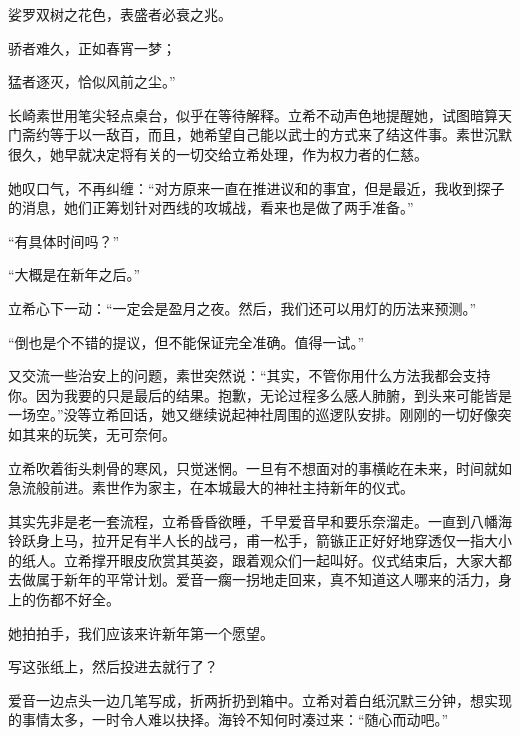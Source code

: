 \documentclass{article}
\begin{document}
娑罗双树之花色，表盛者必衰之兆。



骄者难久，正如春宵一梦；



猛者逐灭，恰似风前之尘。”



长崎素世用笔尖轻点桌台，似乎在等待解释。立希不动声色地提醒她，试图暗算天门斋约等于以一敌百，而且，她希望自己能以武士的方式来了结这件事。素世沉默很久，她早就决定将有关的一切交给立希处理，作为权力者的仁慈。



她叹口气，不再纠缠：“对方原来一直在推进议和的事宜，但是最近，我收到探子的消息，她们正筹划针对西线的攻城战，看来也是做了两手准备。”



“有具体时间吗？”



“大概是在新年之后。”



立希心下一动：“一定会是盈月之夜。然后，我们还可以用灯的历法来预测。”



“倒也是个不错的提议，但不能保证完全准确。值得一试。”



又交流一些治安上的问题，素世突然说：“其实，不管你用什么方法我都会支持你。因为我要的只是最后的结果。抱歉，无论过程多么感人肺腑，到头来可能皆是一场空。”没等立希回话，她又继续说起神社周围的巡逻队安排。刚刚的一切好像突如其来的玩笑，无可奈何。



立希吹着街头刺骨的寒风，只觉迷惘。一旦有不想面对的事横屹在未来，时间就如急流般前进。素世作为家主，在本城最大的神社主持新年的仪式。



其实先非是老一套流程，立希昏昏欲睡，千早爱音早和要乐奈溜走。一直到八幡海铃跃身上马，拉开足有半人长的战弓，甫一松手，箭镞正正好好地穿透仅一指大小的纸人。立希撑开眼皮欣赏其英姿，跟着观众们一起叫好。仪式结束后，大家大都去做属于新年的平常计划。爱音一瘸一拐地走回来，真不知道这人哪来的活力，身上的伤都不好全。



她拍拍手，我们应该来许新年第一个愿望。



写这张纸上，然后投进去就行了？



爱音一边点头一边几笔写成，折两折扔到箱中。立希对着白纸沉默三分钟，想实现的事情太多，一时令人难以抉择。海铃不知何时凑过来：“随心而动吧。”
\end{document}
